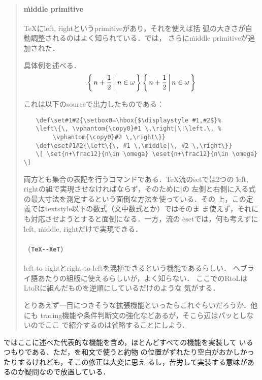 \documentclass[a4paper,11pt]{jsarticle}
\begin{document}
\begin{quotation}
\paragraph{\.{middle} primitive}
\TeX に\.{left}, \.{right}というprimitiveがあり，それを使えば括
弧の大きさが自動調整されるのはよく知られている．\eTeX では，
さらに\.{middle} primitiveが追加された．

具体例を述べる．
\def\set#1#2{\setbox0=\hbox{$\displaystyle #1,#2$}%
\left\{\, \vphantom{\copy0}#1 \,\right|\!\left.\, \vphantom{\copy0}#2 \,\right\}}
\def\eset#1#2{\left\{\, #1 \,\middle|\, #2 \,\right\}}
\[ \set{n+\frac12}{n\in \omega} \eset{n+\frac12}{n\in \omega} \]

これは以下のsourceで出力したものである：

{\narrowbaselines
\begin{verbatim}
　　\def\set#1#2{\setbox0=\hbox{$\displaystyle #1,#2$}%
　　\left\{\, \vphantom{\copy0}#1 \,\right|\!\left.\, %
        \vphantom{\copy0}#2 \,\right\}}
　　\def\eset#1#2{\left\{\, #1 \,\middle|\, #2 \,\right\}}
　　\[ \set{n+\frac12}{n\in \omega} \eset{n+\frac12}{n\in \omega} \]
\end{verbatim}}


両方とも集合の表記を行うコマンドである．\TeX 流の\.{set}では2つの
\.{left}, \.{right}の組で実現させなければならず，そのために$|$の
左側と右側に入る式の最大寸法を測定するという面倒な方法を使っている．その
上，この定義では\.{textstyle}以下の数式（文中数式とか）ではそのま
ま使えず，それにも対応させようとすると面倒になる．一方，\eTeX 流の
\.{eset}では，何も考えずに
\.{left}, \.{middle}, \.{right}だけで実現できる．

\paragraph{\TeXXeT\ \textmd{(\texttt{TeX-{}-XeT})}}
left-to-rightとright-to-leftを混植できるという機能であるらしい．
ヘブライ語あたりの組版に使えるらしいが，よく知らない．
ここでのRtoLはLtoRに組んだものを逆順にしているだけのような
気がする．

\medskip

とりあえず一目につきそうな拡張機能といったらこれぐらいだろうか．他にも
tracing機能や条件判断文の強化などあるが，そこら辺はパッとしないのでここ
で紹介するのは省略することにしよう．
\end{quotation}

\epTeX ではここに述べた代表的な機能を含め，ほとんどすべての機能を実装して
いるつもりである．ただ，\TeXXeT を和文で使うと約物
の位置がずれたり空白がおかしかったりするけれども，そこの修正は大変に思え
るし，苦労して実装する意味があるのか疑問なので放置している．
\end{document}
